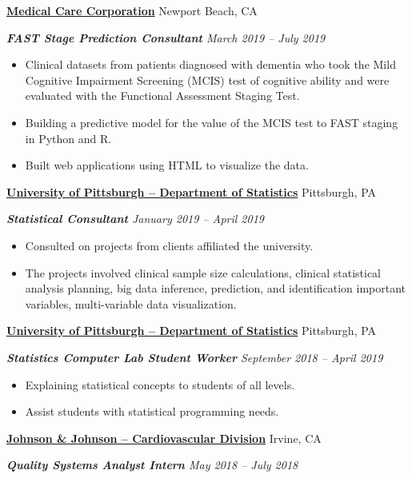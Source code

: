 \documentclass[9pt,letterpaper]{article}
\newcommand{\sectionHead}[1]{\vspace{.7ex} \noindent {\large \textbf{#1} \titlerule[.4pt]}}%
\begin{document}
	\sectionHead{Work History}
	\begin{description}[noitemsep]
		\item \textbf{\ul{Medical Care Corporation}} \hfill Newport Beach, CA
		\item {\textit{\textbf{FAST Stage Prediction Consultant} \hfill March 2019 -- July 2019}}
		\begin{itemize}[noitemsep]
			\item Clinical datasets from patients diagnosed with dementia who took the Mild Cognitive Impairment Screening (MCIS) test of cognitive ability and were evaluated with the Functional Assessment Staging Test.
			\item Building a predictive model for the value of the MCIS test to FAST staging in Python and R.
			\item Built web applications using HTML to visualize the data.
		\end{itemize}
		\item \textbf{\ul{University of Pittsburgh -- Department of Statistics}} \hfill Pittsburgh, PA
		\item {\textit{\textbf{Statistical Consultant} \hfill January 2019 -- April 2019}}
		\begin{itemize}[noitemsep]
			\item Consulted on projects from clients affiliated the university.
			\item The projects involved clinical sample size calculations, clinical statistical analysis planning, big data inference, prediction, and identification important variables, multi-variable data visualization.
		\end{itemize}
		\item \textbf{\ul{University of Pittsburgh -- Department of Statistics}} \hfill Pittsburgh, PA
		\item {\textit{\textbf{Statistics Computer Lab Student Worker} \hfill September 2018 -- April 2019}}
		\begin{itemize}[noitemsep]
			\item Explaining statistical concepts to students of all levels.
			\item Assist students with statistical programming needs.
		\end{itemize}
		\item \textbf{\ul{Johnson \& Johnson -- Cardiovascular Division}} \hfill Irvine, CA
		\item \textit{\textbf{Quality Systems Analyst Intern} \hfill May 2018 -- July 2018}

\end{description}
\end{document}
